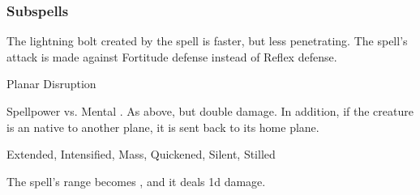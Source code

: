 \subsubsection{Subspells}
The lightning bolt created by the spell is faster, but less penetrating.
The spell's attack is made against Fortitude defense instead of Reflex defense.
\begin{spellsection}{Planar Disruption}
\begin{spellheader}
\end{spellheader}
\begin{spellcontent}
\begin{spelltargetinginfo}
\end{spelltargetinginfo}
\begin{spelleffects}
\begin{spellattack}{Spellpower vs. Mental}
\spellsuccess {}.
\spellcritical
As above, but double damage.
In addition, if the creature is an  native to another plane, it is sent back to its home plane.
\end{spellattack}
\end{spelleffects}
\end{spellcontent}
\begin{spellfooter}
 Extended, Intensified, Mass, Quickened, Silent, Stilled
\end{spellfooter}
\begin{spellsubcontent}
\begin{spellcantrip}
The spell's range becomes \rngclose, and it deals \minus1d damage.
\end{spellcantrip}
\end{spellsubcontent}
\end{spellsection}
